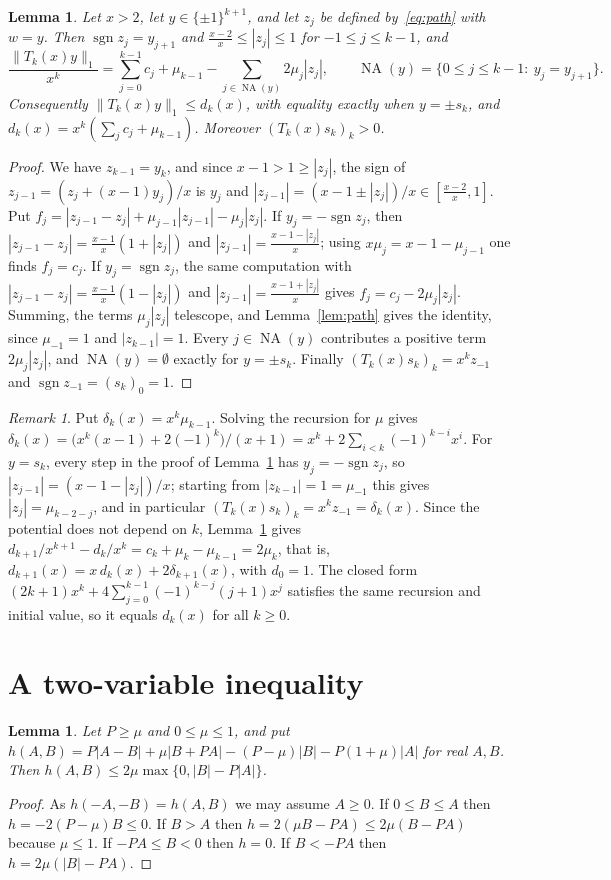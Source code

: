 \documentclass[11pt]{article}
\newtheorem{lemma}[theorem]{Lemma}
\theoremstyle{remark}
\newtheorem{remark}[theorem]{Remark}
\newcommand{\NA}{\operatorname{NA}}
\begin{document}
\begin{lemma}\label{lem:potential}
Let $x>2$, let $y\in\{\pm1\}^{k+1}$, and let $z_j$ be defined
by~\eqref{eq:path} with $w=y$. Then $\operatorname{sgn} z_j=y_{j+1}$ and
$\frac{x-2}{x}\le|z_j|\le1$ for $-1\le j\le k-1$, and
\[
\frac{\|T_k(x)y\|_1}{x^k}=\sum_{j=0}^{k-1}c_j+\mu_{k-1}
 -\sum_{j\in\NA(y)}2\mu_j|z_j|,\qquad
\NA(y)=\{0\le j\le k-1:\ y_j=y_{j+1}\}.
\]
Consequently $\|T_k(x)y\|_1\le d_k(x)$, with equality exactly when
$y=\pm s_k$, and $d_k(x)=x^k(\sum_jc_j+\mu_{k-1})$. Moreover
$(T_k(x)s_k)_k>0$.
\end{lemma}
\begin{proof}
We have $z_{k-1}=y_k$, and since $x-1>1\ge|z_j|$, the sign of
$z_{j-1}=(z_j+(x-1)y_j)/x$ is $y_j$ and
$|z_{j-1}|=(x-1\pm|z_j|)/x\in[\frac{x-2}{x},1]$. Put
$f_j=|z_{j-1}-z_j|+\mu_{j-1}|z_{j-1}|-\mu_j|z_j|$. If $y_j=-\operatorname{sgn}z_j$,
then $|z_{j-1}-z_j|=\frac{x-1}{x}(1+|z_j|)$ and
$|z_{j-1}|=\frac{x-1-|z_j|}{x}$; using $x\mu_j=x-1-\mu_{j-1}$ one finds
$f_j=c_j$. If $y_j=\operatorname{sgn}z_j$, the same computation with
$|z_{j-1}-z_j|=\frac{x-1}{x}(1-|z_j|)$ and $|z_{j-1}|=\frac{x-1+|z_j|}{x}$
gives $f_j=c_j-2\mu_j|z_j|$. Summing, the terms $\mu_j|z_j|$ telescope, and
Lemma~\ref{lem:path} gives the identity, since $\mu_{-1}=1$ and
$|z_{k-1}|=1$. Every $j\in\NA(y)$ contributes a positive term
$2\mu_j|z_j|$, and $\NA(y)=\emptyset$ exactly for $y=\pm s_k$. Finally
$(T_k(x)s_k)_k=x^kz_{-1}$ and $\operatorname{sgn}z_{-1}=(s_k)_0=1$.
\end{proof}

\begin{remark}\label{rem:closed}
Put $\delta_k(x)=x^k\mu_{k-1}$. Solving the recursion for $\mu$ gives
$\delta_k(x)=\bigl(x^k(x-1)+2(-1)^k\bigr)/(x+1)
=x^k+2\sum_{i<k}(-1)^{k-i}x^i$. For $y=s_k$, every step in
the proof of Lemma~\ref{lem:potential} has $y_j=-\operatorname{sgn}z_j$, so
$|z_{j-1}|=(x-1-|z_j|)/x$; starting from $|z_{k-1}|=1=\mu_{-1}$ this gives
$|z_j|=\mu_{k-2-j}$, and in particular
$(T_k(x)s_k)_k=x^kz_{-1}=\delta_k(x)$. Since the potential does not
depend on $k$, Lemma~\ref{lem:potential} gives
$d_{k+1}/x^{k+1}-d_k/x^k=c_k+\mu_k-\mu_{k-1}=2\mu_k$, that is,
$d_{k+1}(x)=x\,d_k(x)+2\delta_{k+1}(x)$, with $d_0=1$. The closed form
$(2k+1)x^k+4\sum_{j=0}^{k-1}(-1)^{k-j}(j+1)x^j$ satisfies the same recursion
and initial value, so it equals $d_k(x)$ for all $k\ge0$.
\end{remark}

\section{A two-variable inequality}
\begin{lemma}\label{lem:cell}
Let $P\ge\mu$ and $0\le\mu\le1$, and put
$h(A,B)=P|A-B|+\mu|B+PA|-(P-\mu)|B|-P(1+\mu)|A|$ for real $A,B$. Then
$h(A,B)\le2\mu\max\{0,|B|-P|A|\}$.
\end{lemma}
\begin{proof}
As $h(-A,-B)=h(A,B)$ we may assume $A\ge0$. If $0\le B\le A$ then
$h=-2(P-\mu)B\le0$. If $B>A$ then $h=2(\mu B-PA)\le2\mu(B-PA)$ because
$\mu\le1$. If $-PA\le B<0$ then $h=0$. If $B<-PA$ then $h=2\mu(|B|-PA)$.
\end{proof}
\end{document}
